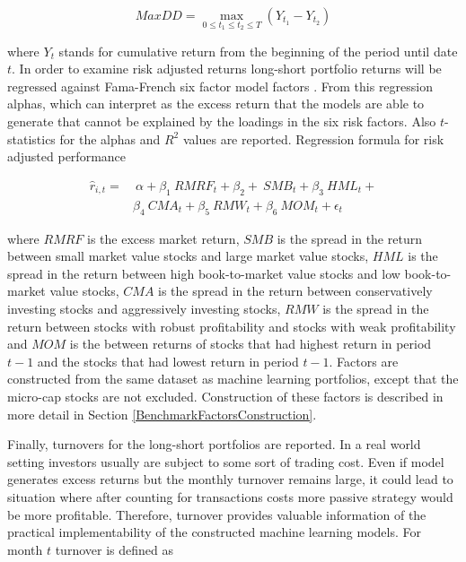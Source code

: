 \documentclass{article}
\begin{document}
\begin{equation}
\label{eq:maxDD}
MaxDD = \max\limits_{0\leq t_1\leq t_2\leq T} (Y_{t_1} - Y_{t_2})
\end{equation}

where $Y_t$ stands for cumulative return from the beginning of the period until date $t$. In order to examine risk adjusted returns long-short portfolio returns will be regressed against Fama-French \citeyear{FAMA20151} six factor model factors \footnotemark. From this regression alphas, which can interpret as the excess return that the models are able to generate that cannot be explained by the loadings in the six risk factors. Also $t$-statistics for the alphas and $R^2$ values are reported. Regression formula for risk adjusted performance \par

\begin{equation}
\label{eq:FFRegFormula}
\begin{split}
\hat r_{i, t} = 	& \ \alpha+ \beta_{1} \ RMRF_{t} + \beta_{2} + \ SMB_{t} + \beta_{3} \ HML_{t} + \\
		&  \beta_{4} \ CMA_{t} +  \beta_{5} \ RMW_{t} + \beta_{6} \ MOM_{t} + \epsilon_{t}
\end{split}
\end{equation}

where $RMRF$ is the excess market return, $SMB$ is the spread in the return between small market value stocks and large market value stocks, $HML$ is the spread in the return between high book-to-market value stocks and low book-to-market value stocks, $CMA$ is the spread in the return between conservatively investing stocks and aggressively investing stocks, $RMW$ is the spread in the return between stocks with robust profitability and stocks with weak profitability and $MOM$ is the between returns of stocks that had highest return in period $t-1$ and the stocks that had lowest return in period $t-1$. Factors are constructed from the same dataset as machine learning portfolios, except that the micro-cap stocks are not excluded. Construction of these factors is described in more detail in Section \ref{BenchmarkFactorsConstruction}. \par


Finally, turnovers for the long-short portfolios are reported. In a real world setting investors usually are subject to some sort of trading cost. Even if model generates excess returns but the monthly turnover remains large, it could lead to situation where after counting for transactions costs more passive strategy would be more profitable. Therefore, turnover provides valuable information of the practical implementability of the constructed machine learning models. For month $t$ turnover is defined as \par
\end{document}
